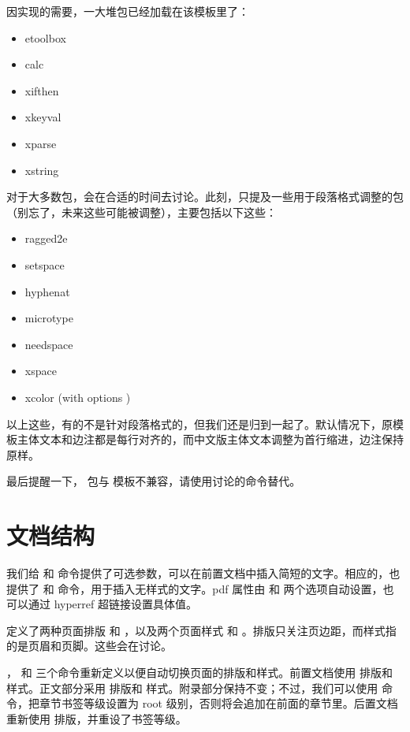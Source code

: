 因实现的需要，一大堆包已经加载在该模板里了：

\begin{itemize}
	\item etoolbox
	\item calc
	\item xifthen
	\item xkeyval
	\item xparse
	\item xstring
\end{itemize}

对于大多数包，会在合适的时间去讨论。此刻，只提及一些用于段落格式调整的包（别忘了，未来这些可能被调整），主要包括以下这些：

\begin{itemize}
	\item ragged2e
	\item setspace
	\item hyphenat
	\item microtype
	\item needspace
	\item xspace
	\item xcolor (with options )
\end{itemize}

以上这些，有的不是针对段落格式的，但我们还是归到一起了。默认情况下，原模板主体文本和边注都是每行对齐的，而中文版主体文本调整为首行缩进，边注保持原样。

最后提醒一下， 包与  模板不兼容，请使用讨论的命令替代。

\section{文档结构}

我们给  和  命令提供了可选参数，可以在前置文档中插入简短的文字。相应的，也提供了  和  命令，用于插入无样式的文字。pdf 属性由  和  两个选项自动设置，也可以通过 hyperref 超链接设置具体值。

定义了两种页面排版  和 ，以及两个页面样式  和 。排版只关注页边距，而样式指的是页眉和页脚。这些会在讨论。

， 和  三个命令重新定义以便自动切换页面的排版和样式。前置文档使用  排版和  样式。正文部分采用  排版和  样式。附录部分保持不变；不过，我们可以使用  命令，把章节书签等级设置为 root 级别，否则将会追加在前面的章节里。后置文档重新使用  排版，并重设了书签等级。
